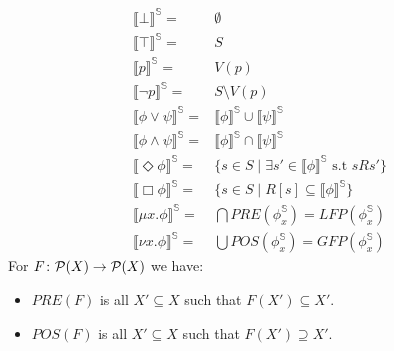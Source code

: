 \begin{align*}
  \llbracket \bot \rrbracket^{\mathbb{S}}   =& \emptyset  \\
  \llbracket \top \rrbracket^{\mathbb{S}}  =&  S \\
  \llbracket p \rrbracket^{\mathbb{S}}   =&  V(p) \\
  \llbracket \neg p \rrbracket^{\mathbb{S}}  =& S\setminus V(p) \\
  \llbracket \phi \lor \psi \rrbracket^{\mathbb{S}} =& \llbracket
  \phi\rrbracket^{\mathbb{S}} \cup \llbracket \psi \rrbracket^{\mathbb{S}} \\
  \llbracket \phi \land \psi \rrbracket^{\mathbb{S}} =& \llbracket
  \phi\rrbracket^{\mathbb{S}} \cap \llbracket \psi \rrbracket^{\mathbb{S}} \\
  \llbracket \Diamond\phi \rrbracket^{\mathbb{S}} =& \{s \in S \mid \exists s' \in \llbracket \phi
  \rrbracket^{\mathbb{S}} \text{ s.t } sRs'\}  \\
  \llbracket \Box\phi \rrbracket^{\mathbb{S}}   =& \{s \in S \mid R[s] \subseteq \llbracket \phi \rrbracket^{\mathbb{S}} \} \\
  \llbracket \mu x.\phi \rrbracket^{\mathbb{S}}   =& \bigcap PRE(\phi^{\mathbb{S}}_{x}) = LFP(\phi^{\mathbb{S}}_{x}) \\
  \llbracket \nu x.\phi \rrbracket^{\mathbb{S}} =& \bigcup POS(\phi^{\mathbb{S}}_{x}) =
  GFP(\phi^{\mathbb{S}}_{x})
\end{align*}
For $F\colon \mathcal{P}(X)\to \mathcal{P}(X)$ we have:

\begin{itemize}
\item $PRE(F)$ is all $X'\subseteq X$ such that
$F(X')\subseteq X'$.
\item $POS(F)$ is all $X'\subseteq X$ such that
$F(X') \supseteq X'$.
\end{itemize}





